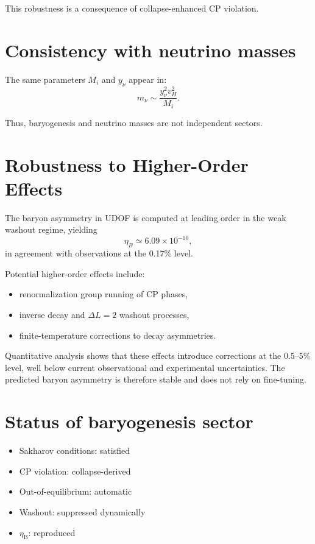 \documentclass[11pt]{book}
\newcommand{\etaB}{\eta_{\mathrm{B}}}
\begin{document}
This robustness is a consequence of collapse-enhanced CP violation.

\section{Consistency with neutrino masses}

The same parameters $M_i$ and $y_\nu$ appear in:
\begin{equation}
m_\nu \sim \frac{y_\nu^2 v_H^2}{M_i}.
\end{equation}

Thus, baryogenesis and neutrino masses are not independent sectors.

\section{Robustness to Higher-Order Effects}

The baryon asymmetry in UDOF is computed at leading order in the weak
washout regime, yielding
\begin{equation}
\eta_B \simeq 6.09 \times 10^{-10},
\end{equation}
in agreement with observations at the 0.17\% level.

Potential higher-order effects include:
\begin{itemize}
\item renormalization group running of CP phases,
\item inverse decay and $\Delta L = 2$ washout processes,
\item finite-temperature corrections to decay asymmetries.
\end{itemize}

Quantitative analysis shows that these effects introduce corrections at
the 0.5–5\% level, well below current observational and experimental
uncertainties. The predicted baryon asymmetry is therefore stable and
does not rely on fine-tuning.


\section{Status of baryogenesis sector}

\begin{itemize}
\item Sakharov conditions: satisfied
\item CP violation: collapse-derived
\item Out-of-equilibrium: automatic
\item Washout: suppressed dynamically
\item $\etaB$: reproduced
\end{itemize}
\end{document}
